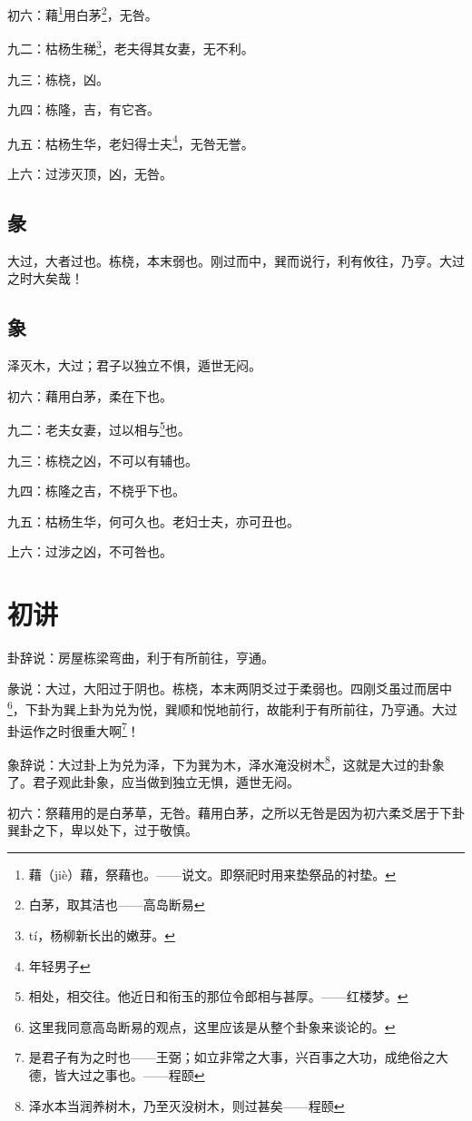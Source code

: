 \documentclass[12pt,oneside]{book}
\begin{document}
初六：藉\footnote{藉（jiè）藉，祭藉也。——说文。即祭祀时用来垫祭品的衬垫。}用白茅\footnote{白茅，取其洁也——高岛断易}，无咎。

九二：枯杨生稊\footnote{tí，杨柳新长出的嫩芽。}，老夫得其女妻，无不利。

九三：栋桡，凶。

九四：栋隆，吉，有它吝。

九五：枯杨生华，老妇得士夫\footnote{年轻男子}，无咎无誉。

上六：过涉灭顶，凶，无咎。

\subsection{彖}
大过，大者过也。栋桡，本末弱也。刚过而中，巽而说行，利有攸往，乃亨。大过之时大矣哉！

\subsection{象}
泽灭木，大过；君子以独立不惧，遁世无闷。

初六：藉用白茅，柔在下也。

九二：老夫女妻，过以相与\footnote{相处，相交往。他近日和衔玉的那位令郎相与甚厚。——红楼梦。}也。

九三：栋桡之凶，不可以有辅也。

九四：栋隆之吉，不桡乎下也。

九五：枯杨生华，何可久也。老妇士夫，亦可丑也。

上六：过涉之凶，不可咎也。

\section{初讲}
卦辞说：房屋栋梁弯曲，利于有所前往，亨通。

彖说：大过，大阳过于阴也。栋桡，本末两阴爻过于柔弱也。四刚爻虽过而居中\footnote{这里我同意高岛断易的观点，这里应该是从整个卦象来谈论的。}，下卦为巽上卦为兑为悦，巽顺和悦地前行，故能利于有所前往，乃亨通。大过卦运作之时很重大啊\footnote{是君子有为之时也——王弼；如立非常之大事，兴百事之大功，成绝俗之大德，皆大过之事也。——程颐}！

象辞说：大过卦上为兑为泽，下为巽为木，泽水淹没树木\footnote{泽水本当润养树木，乃至灭没树木，则过甚矣——程颐}，这就是大过的卦象了。君子观此卦象，应当做到独立无惧，遁世无闷。

初六：祭藉用的是白茅草，无咎。藉用白茅，之所以无咎是因为初六柔爻居于下卦巽卦之下，卑以处下，过于敬慎。
\end{document}
